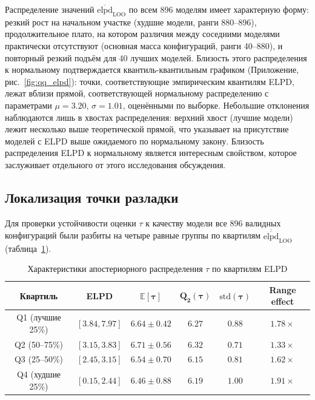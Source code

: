 \documentclass[14pt]{mmcs_article}
\begin{document}
	Распределение значений $\overline{\mathrm{elpd}}_{\mathrm{LOO}}$
	по всем 896 моделям имеет характерную форму: резкий рост на
	начальном участке (худшие модели, ранги 880--896),
	продолжительное плато, на котором различия между соседними
	моделями практически отсутствуют (основная масса
	конфигураций, ранги 40--880), и повторный резкий подъём для
	40 лучших моделей. Близость этого распределения к нормальному
	подтверждается квантиль-квантильным графиком (Приложение, рис.~\ref{fig:qq_elpd}): точки, соответствующие
	эмпирическим квантилям ELPD, лежат вблизи прямой,
	соответствующей нормальному распределению с параметрами
	$\mu = 3.20$, $\sigma = 1.01$, оценёнными по выборке.
	Небольшие отклонения наблюдаются лишь в хвостах
	распределения: верхний хвост (лучшие модели) лежит несколько
	выше теоретической прямой, что указывает на присутствие
	моделей с ELPD выше ожидаемого по нормальному закону. Близость распределения ELPD к нормальному является интересным свойством, которое заслуживает отдельного от этого исследования обсуждения.
	
	\subsection{Локализация точки разладки}
	
	Для проверки устойчивости оценки $\tau$ к качеству модели все
	896 валидных конфигураций были разбиты на четыре равные группы
	по квартилям $\overline{\overline{\mathrm{elpd}}}_{\mathrm{LOO}}$
	(таблица~\ref{tab:tau_quartiles}).
	
	\begin{table}[H]
		\centering
		\caption{Характеристики апостериорного распределения $\tau$
			по квартилям ELPD}
		\label{tab:tau_quartiles}
		\begin{tabular}{|c|c|c|c|c|c|}
			\hline
			\textbf{Квартиль} & \textbf{ELPD} & 
			$\boldsymbol{\mathbb{E}[\tau]}$ & 
			$\boldsymbol{Q_2(\tau)}$ & 
			$\boldsymbol{\mathrm{std}(\tau)}$ & 
			\textbf{Range effect} \\
			\hline
			Q1 (лучшие 25\%) & $[3.84, 7.97]$ & $6.64 \pm 0.42$ & $6.27$ & $0.88$ & $1.78\times$ \\
			\hline
			Q2 (50--75\%) & $[3.15, 3.83]$ & $6.71 \pm 0.56$ & $6.32$ & $0.71$ & $1.33\times$ \\
			\hline
			Q3 (25--50\%) & $[2.45, 3.15]$ & $6.54 \pm 0.70$ & $6.15$ & $0.81$ & $1.62\times$ \\
			\hline
			Q4 (худшие 25\%) & $[0.15, 2.44]$ & $6.46 \pm 0.88$ & $6.19$ & $1.00$ & $1.91\times$ \\
			\hline
		\end{tabular}
	\end{table}
	
\end{document}
